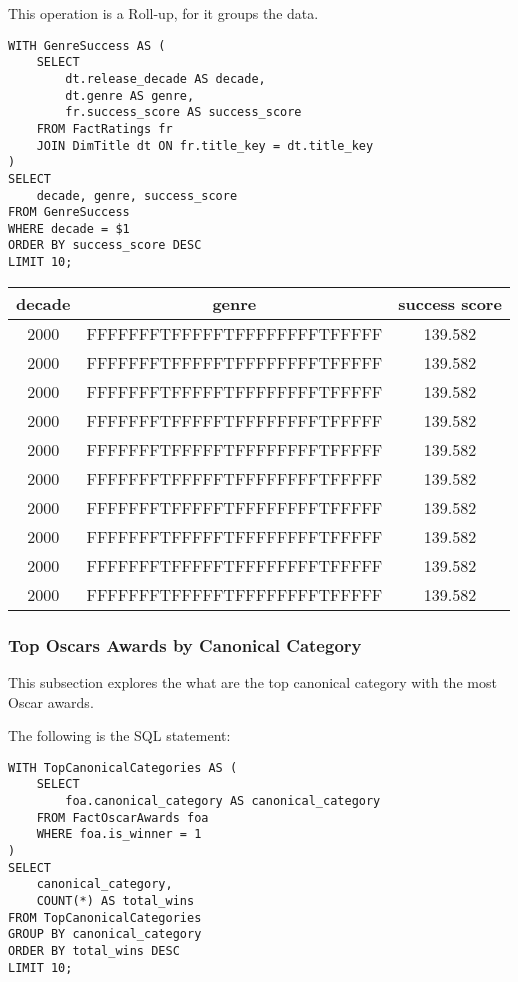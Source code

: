 \documentclass[sigconf, pbalance]{acmart}
\begin{document}
This operation is a Roll-up, for it groups the data.

\begin{lstlisting}[style=SQLStyle]
WITH GenreSuccess AS (
    SELECT
        dt.release_decade AS decade,
        dt.genre AS genre,
        fr.success_score AS success_score
    FROM FactRatings fr
    JOIN DimTitle dt ON fr.title_key = dt.title_key
)
SELECT
    decade, genre, success_score
FROM GenreSuccess
WHERE decade = $1
ORDER BY success_score DESC
LIMIT 10;
\end{lstlisting}

\begin{center}
\begin{tabular}{|c|c|c|}
\hline
decade & genre & success score \\
\hline
2000 & FFFFFFFTFFFFFTFFFFFFFFTFFFFF & 139.582 \\
2000 & FFFFFFFTFFFFFTFFFFFFFFTFFFFF & 139.582 \\ 
2000 & FFFFFFFTFFFFFTFFFFFFFFTFFFFF & 139.582 \\ 
2000 & FFFFFFFTFFFFFTFFFFFFFFTFFFFF & 139.582 \\ 
2000 & FFFFFFFTFFFFFTFFFFFFFFTFFFFF & 139.582 \\ 
2000 & FFFFFFFTFFFFFTFFFFFFFFTFFFFF & 139.582 \\ 
2000 & FFFFFFFTFFFFFTFFFFFFFFTFFFFF & 139.582 \\ 
2000 & FFFFFFFTFFFFFTFFFFFFFFTFFFFF & 139.582 \\ 
2000 & FFFFFFFTFFFFFTFFFFFFFFTFFFFF & 139.582 \\ 
2000 & FFFFFFFTFFFFFTFFFFFFFFTFFFFF & 139.582 \\ 
\hline
\end{tabular}
\end{center}

\subsubsection{Top Oscars Awards by Canonical Category}

This subsection explores the what are the top canonical category with the most Oscar awards. 

The following is the SQL statement:
\begin{lstlisting}[style=SQLStyle]
WITH TopCanonicalCategories AS (
    SELECT
        foa.canonical_category AS canonical_category
    FROM FactOscarAwards foa
    WHERE foa.is_winner = 1
)
SELECT
    canonical_category,
    COUNT(*) AS total_wins
FROM TopCanonicalCategories
GROUP BY canonical_category
ORDER BY total_wins DESC
LIMIT 10;
\end{lstlisting}
\end{document}
